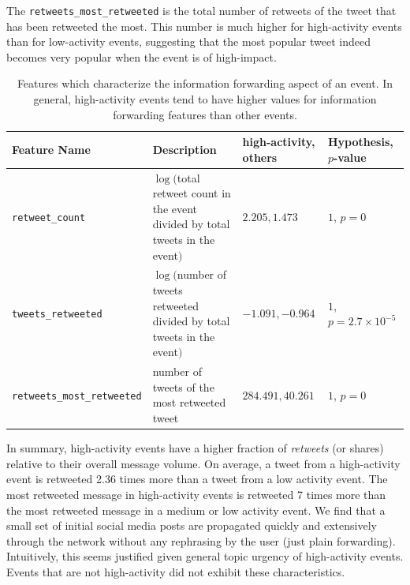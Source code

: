 The \texttt{retweets\_most\_retweeted} is the total number of retweets of the
tweet that has been retweeted the most. 
%
This number is much higher for high-activity events than for low-activity
events, suggesting that the most popular tweet indeed becomes very popular when
the event is of high-impact.

\begin{table}
  \centering
  {\small
    \begin{tabular}{llll}
      \toprule
      Feature Name &  \multicolumn{1}{l}{Description} & high-activity, others& Hypothesis, $p$-value\\
      \midrule
      \texttt{retweet\_count} & \pbox{20cm}{$\log($total retweet count \\in the event divided by\\ total tweets in the event$)$} & $2.205, 1.473$ & $1$, $p = 0$ \\
      \midrule
      \texttt{tweets\_retweeted} & \pbox{20cm}{$\log($number of tweets \\retweeted divided by\\ total tweets in the event$)$} & $-1.091, -0.964$ & $1$, $p = 2.7\times10^{-5}$ \\
      \midrule
      \texttt{retweets\_most\_retweeted} & \pbox{20cm}{number of tweets of the\\ most retweeted tweet} & $284.491, 40.261$ & $1$, $p = 0$ \\
      \bottomrule
    \end{tabular}
  }
  \caption[Information forwarding characteristics of events]{Features which characterize the information forwarding aspect of an event.
  In general, high-activity events tend to have higher values for information forwarding 
  features than other events.}
  \label{tab:information_forwarding}
\end{table}


In summary, high-activity events have a higher fraction of {\em retweets} (or
shares) relative to their overall message volume. 
%
On average, a tweet from a high-activity event is retweeted 2.36 times more than
a tweet from a low activity event. 
%
The most retweeted message in high-activity events is retweeted 7 times more
than the most retweeted message in a medium or low activity event. 
%
We find that a small set of initial social media posts are propagated quickly
and extensively through the network without any rephrasing by the user (just
plain forwarding). 
%
Intuitively, this seems justified given general topic urgency of high-activity
events. 
%
Events that are not high-activity did not exhibit these characteristics.

